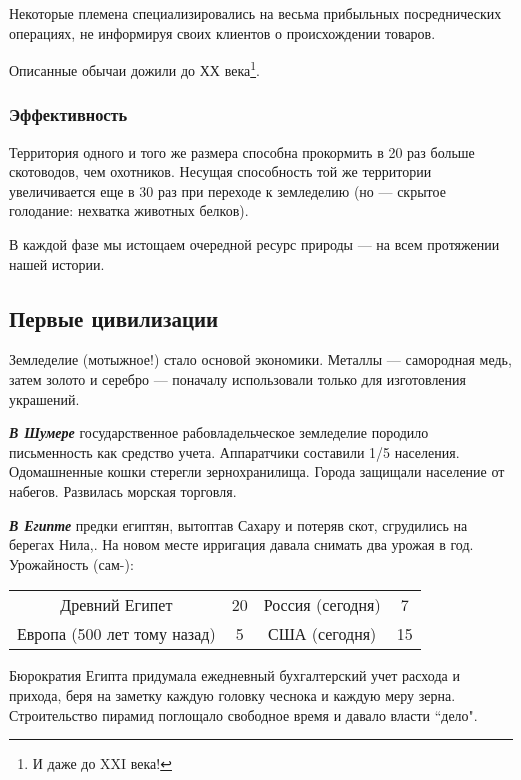 Некоторые племена специализировались на весьма прибыльных посреднических операциях, не информируя своих клиентов о
происхождении товаров.

Описанные обычаи дожили до ХХ века\footnote{И даже до \foreignlanguage{english}{XXI}
века!}. 

\subsubsection[Эффективность ]{Эффективность}
Территория одного и того же размера способна прокормить в 20 раз больше скотоводов, чем охотников. Несущая способность
той же территории увеличивается еще в 30 раз при переходе к земледелию (но — скрытое голодание: нехватка животных
белков).

В каждой фазе мы истощаем очередной ресурс природы — на всем протяжении нашей истории.

\subsection[Первые цивилизации]{Первые цивилизации}
Земледелие (мотыжное!) стало основой экономики. Металлы — самородная медь, затем золото и серебро — поначалу
использовали только для изготовления украшений.

\textbf{\textit{В Шумере}} государственное рабовладельческое земледелие породило письменность как средство учета.
Аппаратчики составили 1/5 населения. Одомашненные кошки стерегли зернохранилища. Города защищали население от набегов.
Развилась морская торговля.

\textbf{\textit{В Египте}} предки египтян, вытоптав Сахару и потеряв скот, сгрудились на берегах Нила,. На новом месте
ирригация давала снимать два урожая в год. Урожайность (сам-):

\begin{center}
\tablefirsthead{}
\tablehead{}
\tabletail{}
\tablelasttail{}
\begin{supertabular}{cccc}
Древний Египет & 20 & Россия (сегодня) &  7\\
 Европа (500 лет тому назад) &  5 & США (сегодня) & 15\\
\end{supertabular}
\end{center}

Бюрократия Египта придумала ежедневный бухгалтерский учет расхода и прихода, беря на заметку каждую головку чеснока и
каждую меру зерна. Строительство пирамид поглощало свободное время и давало власти ``дело".


